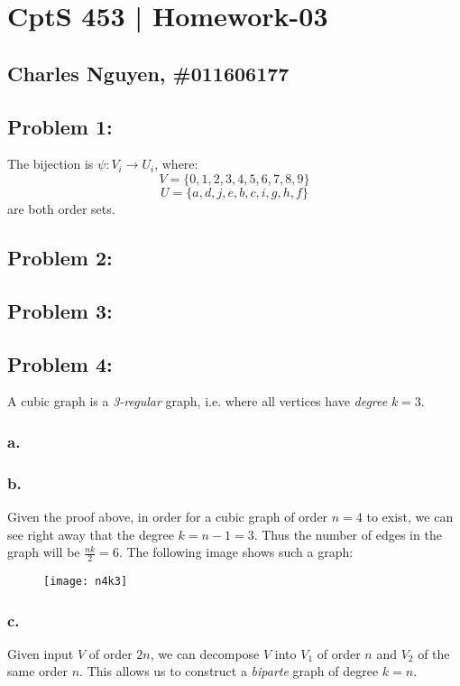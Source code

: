 \documentclass[12pt,letterpaper]{article}
\begin{document}
\section*{CptS 453 | Homework-03 }
\subsection*{Charles Nguyen, \#011606177 }

\subsection*{Problem 1:}


The bijection is $\psi: V_i \rightarrow U_i $, where:
\[ V = \{0,1,2,3,4,5,6,7,8,9\} \]
\[ U = \{a,d,j,e,b,c,i,g,h,f\} \]
are both order sets.

\subsection*{Problem 2:}

\pagebreak

\subsection*{Problem 3:}


\pagebreak
\subsection*{Problem 4:}

A cubic graph is a \emph{3-regular} graph, i.e. where all vertices have
\emph{degree} $k=3$.

\subsubsection*{a.}

\subsubsection*{b.}
Given the proof above, in order for a cubic graph of order $n=4$ to exist, we
can see right away that the degree $k=n-1=3$. Thus the number of edges in the
graph will be $\frac{nk}{2} = 6$. The following image shows such a graph:

\begin{figure}[h]
\texttt{[image: n4k3]}
\centering
\end{figure}

\subsubsection*{c.}
Given input $V$ of order $2n$, we can decompose $V$ into $V_1$ of order $n$
and $V_2$ of the same order $n$.  This allows us to construct a \emph{biparte} graph of degree $k=n$.
\end{document}
